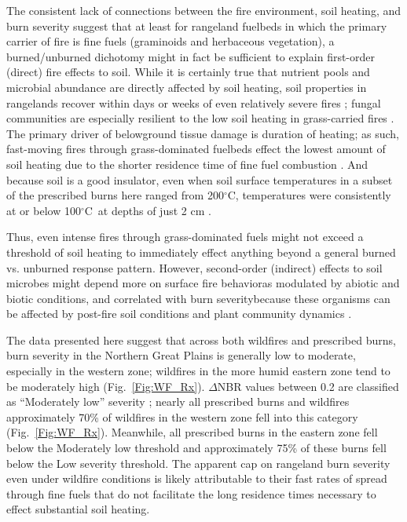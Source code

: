 \documentclass[fire,article,submit,oneauthor,pdftex]{Definitions/mdpi}
\newcommand{\degC}{$^\circ$C}
\begin{document}
The consistent lack of connections between the fire environment, soil heating, and burn severity suggest that at least for rangeland fuelbeds in which the primary carrier of fire is fine fuels (graminoids and herbaceous vegetation), a burned/unburned dichotomy might in fact be sufficient to explain first-order (direct) fire effects to soil. 
While it is certainly true that nutrient pools and microbial abundance are directly affected by soil heating, soil properties in rangelands recover within days or weeks of even relatively severe fires \cite{mcgranahan2022,docherty2012}; fungal communities are especially resilient to the low soil heating in grass-carried fires \cite{egidi2016}. 
The primary driver of belowground tissue damage is duration of heating; as such, fast-moving fires through grass-dominated fuelbeds effect the lowest amount of soil heating due to the shorter residence time of fine fuel combustion \cite{neary1999a, robichaud2000}. 
And because soil is a good insulator, even when soil surface temperatures in a subset of the prescribed burns here ranged from 200\degC, temperatures were consistently at or below 100\degC~at depths of just 2 cm \cite{mcgranahan2022}. 

Thus, even intense fires through grass-dominated fuels might not exceed a threshold of soil heating to immediately effect anything beyond a general burned vs. unburned response pattern. 
However, second-order (indirect) effects to soil microbes might depend more on surface fire behavior\textemdash as modulated by abiotic and biotic conditions, and correlated with burn severity\textemdash because these organisms can be affected by post-fire soil conditions and plant community dynamics \cite{neary1999a}.


The data presented here suggest that across both wildfires and prescribed burns, burn severity in the Northern Great Plains is generally low to moderate, especially in the western zone; wildfires in the more humid eastern zone tend to be moderately high (Fig.~\ref{Fig:WF_Rx}).
$\Delta$NBR values between 0.2 are classified as ``Moderately low'' severity \cite{key2006a}; nearly all prescribed burns and wildfires approximately 70\% of wildfires in the western zone fell into this category (Fig.~\ref{Fig:WF_Rx}). 
Meanwhile, all prescribed burns in the eastern zone fell below the Moderately low threshold and approximately 75\% of these burns fell below the Low severity threshold. 
The apparent cap on rangeland burn severity even under wildfire conditions is likely attributable to their fast rates of spread through fine fuels that do not facilitate the long residence times necessary to effect substantial soil heating.
\end{document}
